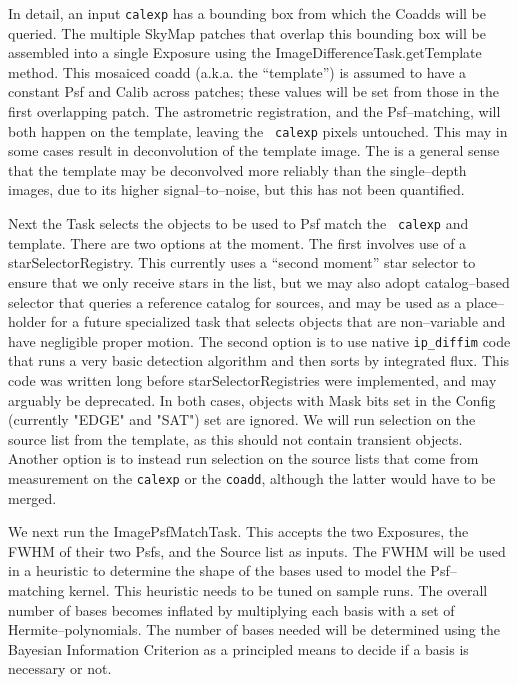 \documentclass[12pt]{article}
\begin{document}
In detail, an input {\tt calexp} has a bounding box from which the
Coadds will be queried.  The multiple SkyMap patches that overlap this
bounding box will be assembled into a single Exposure using the
ImageDifferenceTask.getTemplate method.  This mosaiced coadd
(a.k.a. the ``template'') is assumed to have a constant Psf and Calib
across patches; these values will be set from those in the first
overlapping patch.  The astrometric registration, and the
Psf--matching, will both happen on the template, leaving the {\tt
  calexp} pixels untouched.  This may in some cases result in
deconvolution of the template image.  The is a general sense that the
template may be deconvolved more reliably than the single--depth
images, due to its higher signal--to--noise, but this has not been
quantified.

Next the Task selects the objects to be used to Psf match the {\tt
  calexp} and template.  There are two options at the moment.  The
first involves use of a starSelectorRegistry.  This currently uses a
``second moment'' star selector to ensure that we only receive stars
in the list, but we may also adopt catalog--based selector that
queries a reference catalog for sources, and may be used as a
place--holder for a future specialized task that selects objects that
are non--variable and have negligible proper motion.  The second
option is to use native {\tt ip\_diffim} code that runs a very basic
detection algorithm and then sorts by integrated flux.  This code was
written long before starSelectorRegistries were implemented, and may
arguably be deprecated.  In both cases, objects with Mask bits set in
the Config (currently "EDGE" and "SAT") set are ignored.  We will run
selection on the source list from the template, as this should not
contain transient objects.  Another option is to instead run selection
on the source lists that come from measurement on the {\tt calexp} or
the {\tt coadd}, although the latter would have to be merged.

We next run the ImagePsfMatchTask.  This accepts the two Exposures,
the FWHM of their two Psfs, and the Source list as inputs.  The FWHM
will be used in a heuristic to determine the shape of the bases used
to model the Psf--matching kernel.  This heuristic needs to be tuned
on sample runs.  The overall number of bases becomes inflated by
multiplying each basis with a set of Hermite--polynomials.  The number
of bases needed will be determined using the Bayesian Information
Criterion as a principled means to decide if a basis is necessary or
not.
\end{document}
